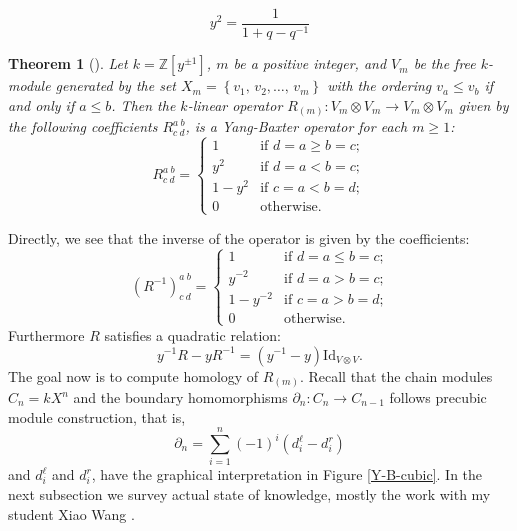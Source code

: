 \documentclass[12pt]{amsart}
\newtheorem{theorem}{Theorem}[section]
\begin{document}
\begin{equation*}
y^{2}=\dfrac{1}{1+q-q^{-1}}
\end{equation*}
\begin{theorem}[\cite{PrWa2}]\label{PW}
Let ${k}=\mathbb{Z}[y^{\pm1}]$, $m$ be a positive integer, and $V_{m}$ be the free ${k}$-module generated by the set $X_{m} = \left\lbrace v_{1},\, v_{2}, \dots,\, v_{m} \right\rbrace $ with the ordering $ v_{a}\leq  v_{b}$ if and only if $a \leq b$. Then the ${k}$-linear operator $R_{(m)}: V_{m}\otimes V_{m} \longrightarrow V_{m}\otimes V_{m}$ given by the following coefficients $R_{c \ d}^{a \ b}$, is a Yang-Baxter operator for each $m\geq 1$:
\begin{equation*}
R_{c \ d}^{a \ b}=
\begin{cases}
1       & \text{if $d=a \geq b=c;$} \\
y^{2}        & \text{if $d=a < b=c;$} \\
1-y^{2}  & \text{if $c=a < b=d;$}\\
0         & \text{otherwise.}
\end{cases}   
\end{equation*}
\end{theorem}

Directly, we see that the inverse of the operator is given by the coefficients:
\begin{equation*}
(R^{-1})_{c \ d}^{a \ b}=
\begin{cases}
1       & \text{if $d=a \leq b=c$;} \\
y^{-2}        & \text{if $d=a > b=c$;} \\
1-y^{-2}  & \text{if $c=a > b=d$;}\\
0         & \text{otherwise.}
\end{cases}  
\end{equation*}
Furthermore $R$ satisfies a quadratic relation:
\begin{equation*}
y^{-1}R-yR^{-1}=(y^{-1}-y)\mathrm{Id}_{V\otimes V}.   
\end{equation*}
The goal now is to compute homology of $R_{(m)}$. Recall that the chain modules $C_{n}=kX^n$ and the boundary homomorphisms $\partial_{n}:C_n\to C_{n-1} $ follows precubic module construction, that is,
\begin{equation*}
\partial_n=\sum_{i=1}^n(-1)^i(d_i^{\ell}-d_i^r) 
\end{equation*}
and $d_i^{\ell}$ and $d_i^r$, have the graphical interpretation in Figure \ref{Y-B-cubic}. In the next subsection we survey actual state of knowledge, mostly the work with my student Xiao Wang \cite{PrWa2}. 
\end{document}
